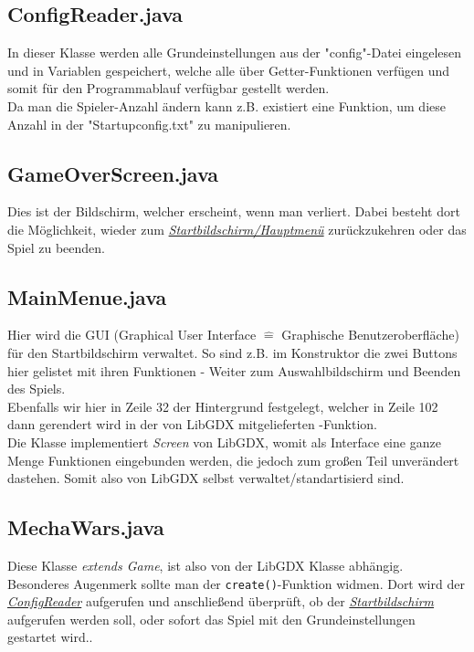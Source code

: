 \documentclass[12pt,a4paper,oneside]{book}
\theoremstyle{plain}
\numberwithin{equation}{chapter} \DeclareMathOperator{\Var}{Var}
\begin{document}
\subsection{ConfigReader.java}
    In dieser Klasse werden alle Grundeinstellungen aus der "config"-Datei eingelesen und in Variablen gespeichert, welche alle über Getter-Funktionen verfügen und somit für den Programmablauf verfügbar gestellt werden. \\
    Da man die Spieler-Anzahl ändern kann z.B. existiert eine Funktion, um diese Anzahl in der "Startupconfig.txt" zu manipulieren.

\hypertarget{GameOverScreen.java}{} 
\subsection{GameOverScreen.java}
    Dies ist der Bildschirm, welcher erscheint, wenn man verliert. Dabei besteht dort die Möglichkeit, wieder zum \hyperlink{MainMenue.java}{\textit{Startbildschirm/Hauptmenü}} zurückzukehren oder das Spiel zu beenden.
    
\hypertarget{MainMenue.java}{}
\subsection{MainMenue.java}
    Hier wird die GUI (Graphical User Interface $\widehat{=}$ Graphische Benutzeroberfläche) für den Startbildschirm verwaltet. So sind z.B. im Konstruktor die zwei Buttons hier gelistet mit ihren Funktionen - Weiter zum Auswahlbildschirm und Beenden des Spiels. \\
    Ebenfalls wir hier in Zeile 32 der Hintergrund festgelegt, welcher in Zeile 102 dann gerendert wird in der von LibGDX mitgelieferten -Funktion. \\
    Die Klasse implementiert \textit{Screen} von LibGDX, womit als Interface eine ganze Menge Funktionen eingebunden werden, die jedoch zum großen Teil unverändert dastehen. Somit also von LibGDX selbst verwaltet/standartisierd sind.
    
\subsection{MechaWars.java}
    Diese Klasse \textit{extends Game}, ist also von der LibGDX Klasse abhängig. \\
    Besonderes Augenmerk sollte man der \texttt{create()}-Funktion widmen. Dort wird der \hyperlink{ConfigReader.java}{\textit{ConfigReader}} aufgerufen und anschließend überprüft, ob der \hyperlink{MainMenue.java}{\textit{Startbildschirm}} aufgerufen werden soll, oder sofort das Spiel mit den Grundeinstellungen gestartet wird..
\end{document}
